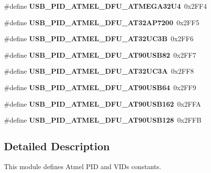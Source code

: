 \begin{DoxyCompactItemize}
\#define {\bfseries U\+S\+B\+\_\+\+P\+I\+D\+\_\+\+A\+T\+M\+E\+L\+\_\+\+D\+F\+U\+\_\+\+A\+T\+M\+E\+G\+A32\+U4}~0x2\+F\+F4
\item 
\mbox{\label{group__usb__atmel__ids__group_gab964ea6d7b5cd446503f1cfd117c6fb7}} 
\#define {\bfseries U\+S\+B\+\_\+\+P\+I\+D\+\_\+\+A\+T\+M\+E\+L\+\_\+\+D\+F\+U\+\_\+\+A\+T32\+A\+P7200}~0x2\+F\+F5
\item 
\mbox{\label{group__usb__atmel__ids__group_ga269e2728ce539d20958aa5f2585b66f6}} 
\#define {\bfseries U\+S\+B\+\_\+\+P\+I\+D\+\_\+\+A\+T\+M\+E\+L\+\_\+\+D\+F\+U\+\_\+\+A\+T32\+U\+C3B}~0x2\+F\+F6
\item 
\mbox{\label{group__usb__atmel__ids__group_gadfe12f6d5db92d6fafd65581533f2280}} 
\#define {\bfseries U\+S\+B\+\_\+\+P\+I\+D\+\_\+\+A\+T\+M\+E\+L\+\_\+\+D\+F\+U\+\_\+\+A\+T90\+U\+S\+B82}~0x2\+F\+F7
\item 
\mbox{\label{group__usb__atmel__ids__group_ga90c652420209632cdaf35e052c2a150f}} 
\#define {\bfseries U\+S\+B\+\_\+\+P\+I\+D\+\_\+\+A\+T\+M\+E\+L\+\_\+\+D\+F\+U\+\_\+\+A\+T32\+U\+C3A}~0x2\+F\+F8
\item 
\mbox{\label{group__usb__atmel__ids__group_ga42a899ba4187b397c1d7aaf0e5c51a17}} 
\#define {\bfseries U\+S\+B\+\_\+\+P\+I\+D\+\_\+\+A\+T\+M\+E\+L\+\_\+\+D\+F\+U\+\_\+\+A\+T90\+U\+S\+B64}~0x2\+F\+F9
\item 
\mbox{\label{group__usb__atmel__ids__group_ga9819f0f192d21296c7e548d6fb59ec32}} 
\#define {\bfseries U\+S\+B\+\_\+\+P\+I\+D\+\_\+\+A\+T\+M\+E\+L\+\_\+\+D\+F\+U\+\_\+\+A\+T90\+U\+S\+B162}~0x2\+F\+FA
\item 
\mbox{\label{group__usb__atmel__ids__group_ga7cdcdd407742dfa62250a4120c95ed0b}} 
\#define {\bfseries U\+S\+B\+\_\+\+P\+I\+D\+\_\+\+A\+T\+M\+E\+L\+\_\+\+D\+F\+U\+\_\+\+A\+T90\+U\+S\+B128}~0x2\+F\+FB
\end{DoxyCompactItemize}


\subsection{Detailed Description}
This module defines Atmel P\+ID and V\+I\+Ds constants. 
